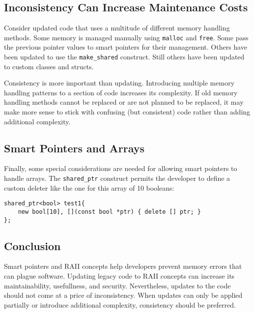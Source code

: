 \subsection{Inconsistency Can Increase Maintenance Costs}

Consider updated code that uses a multitude of different memory handling methods. Some memory is managed manually using \texttt{malloc} and \texttt{free}. Some pass the previous pointer values to smart pointers for their management. Others have been updated to use the \texttt{make\_shared} construct. Still others have been updated to custom classes and structs.

Consistency is more important than updating. Introducing multiple memory handling patterns to a section of code increases its complexity. If old memory handling methods cannot be replaced or are not planned to be replaced, it may make more sense to stick with confusing (but consistent) code rather than adding additional complexity.

\subsection{Smart Pointers and Arrays}

Finally, some special considerations are needed for allowing smart pointers to handle arrays. The \texttt{shared\_ptr} construct permits the developer to define a custom deleter like the one for this array of 10 booleans:

\begin{lstlisting}[caption={Custom Deleter},captionpos=b,style=CStyle,basicstyle=\small]
shared_ptr<bool> test1{
	new bool[10], [](const bool *ptr) { delete [] ptr; }
};
\end{lstlisting}

\subsection{Conclusion}

Smart pointers and RAII concepts help developers prevent memory errors that can plague software. Updating legacy code to RAII concepts can increase its maintainability, usefullness, and security. Nevertheless, updates to the code should not come at a price of inconsistency. When updates can only be applied partially or introduce additional complexity, consistency should be preferred.
